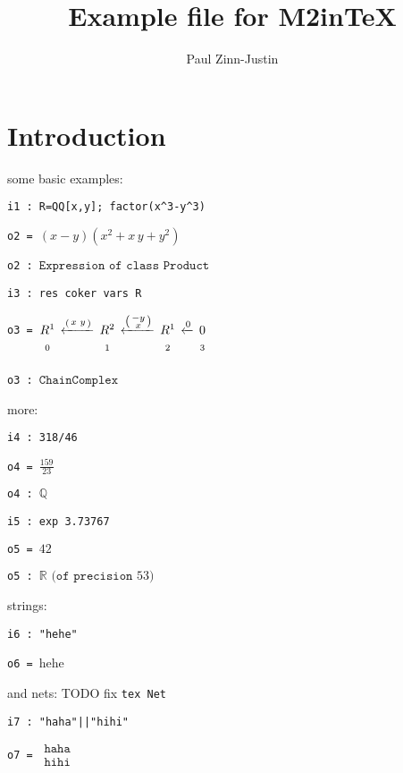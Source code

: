 \documentclass[12pt,a4paper]{amsart}
\title{Example file for M2inTeX}
\author{Paul Zinn-Justin}
\begin{document}
\maketitle

\section{Introduction}
some basic examples:
\smallskip
\begin{verbatim}
i1 : R=QQ[x,y]; factor(x^3-y^3)
\end{verbatim}
\noindent\verb|o2 = |$\left(x-y\right)\left(x^{  2}+x\,y+y^{  2}\right)$

\noindent\verb|o2 : |$\texttt{Expression}\texttt{ of class }\texttt{Product}$
\begin{verbatim}
i3 : res coker vars R
\end{verbatim}
\noindent\verb|o3 = |$\underset{\vphantom{\Big|}0}{R^{  1}}\,\xleftarrow{\left(\begin{smallmatrix}
x&y\\
\end{smallmatrix}\right)}\,\underset{\vphantom{\Big|}1}{R^{  2}}\,\xleftarrow{\left(\begin{smallmatrix}
-y\\
x\\
\end{smallmatrix}\right)}\,\underset{\vphantom{\Big|}2}{R^{  1}}\,\xleftarrow{0}\,\underset{\vphantom{\Big|}3}{0}$

\noindent\verb|o3 : |$\texttt{ChainComplex}$
\smallskip

more:
\smallskip
\begin{verbatim}
i4 : 318/46
\end{verbatim}
\noindent\verb|o4 = |$\frac{159}{ 23}$

\noindent\verb|o4 : |${\mathbb Q}$
\begin{verbatim}
i5 : exp 3.73767
\end{verbatim}
\noindent\verb|o5 = |${42}$

\noindent\verb|o5 : |${\mathbb R}\texttt{ (of precision } 53\texttt{)}$
\smallskip

strings:
\smallskip
\begin{verbatim}
i6 : "hehe"
\end{verbatim}
\noindent\verb|o6 = |hehe
\smallskip

and nets: TODO fix {\tt tex Net}
\smallskip
\begin{verbatim}
i7 : "haha"||"hihi"
\end{verbatim}
\noindent\verb|o7 = |$\begin{array}{l}\texttt{haha}\\
\texttt{hihi}\end{array}$
\smallskip
\end{document}
